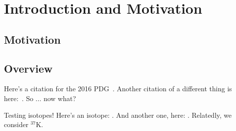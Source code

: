 
%
\chapter{Introduction and Motivation}
\label{IntroductionChapter}
\section{Motivation}
\label{motivation}

\section{Overview}
\label{overview}
Here's a citation for the 2016 PDG~\cite{PDG2016}.  Another citation of a different thing is here:~\cite{Determination2014}.  So ... now what?

Testing isotopes!  Here's an isotope:  .  And another one, here:  .  Relatedly, we consider $^{37}$K.


%
%
